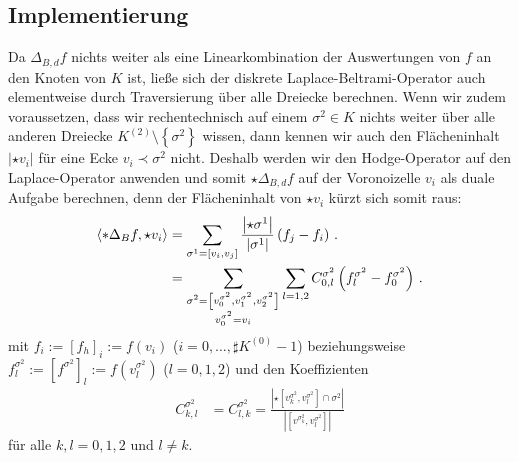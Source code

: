   \subsection{Implementierung}
    Da \( \Delta_{B,d} f \) nichts weiter als eine Linearkombination der Auswertungen von \( f \) an den
    Knoten von \( K \) ist, ließe sich der diskrete Laplace-Beltrami-Operator auch elementweise durch
    Traversierung über alle Dreiecke berechnen.
    Wenn wir zudem voraussetzen, dass wir rechentechnisch auf einem \( \sigma^{2}\in K \) nichts weiter
    über alle anderen Dreiecke \( K^{(2)}\setminus\left\{ \sigma^{2} \right\} \) wissen, 
    dann kennen wir auch den Flächeninhalt \( \left| \star v_{i} \right| \) für eine Ecke 
    \( v_{i}\prec\sigma^{2} \) nicht.
    Deshalb werden wir den Hodge-Operator auf den Laplace-Operator anwenden und somit \( \star\Delta_{B,d} f \)
    auf der Voronoizelle \( v_{i} \) als duale Aufgabe berechnen, 
    denn der Flächeninhalt von \( \star v_{i} \) kürzt sich
    somit raus:
    \begin{align}
      \left\langle *\Delta_{B} f , \star v_{i} \right\rangle
          &= \sum_{\sigma^{1}=\left[ v_{i}, v_{j} \right]} 
                       \frac{\left| \star\sigma^{1} \right|}{\left| \sigma^{1} \right|}
                       \left( f_{j} - f_{i} \right) \,\text{.} \\
          &= \sum_{\substack{\sigma^{2}=\left[ v^{\sigma^{2}}_{0},v^{\sigma^{2}}_{1},v^{\sigma^{2}}_{2} \right]\\
                                               v^{\sigma^{2}}_{0} = v_{i}}}
                  \sum_{l=1,2} C^{\sigma^{2}}_{0,l} 
                          \left( f^{\sigma^{2}}_{l} -  f^{\sigma^{2}}_{0}\right) \,\text{.}
          \label{eqLaplaceElementSummanden}
    \end{align}
    mit \( f_{i} := \left[ f_{h} \right]_{i} := f(v_{i}) \) (\( i=0,\ldots,\sharp K^{(0)}-1 \)) 
    beziehungsweise 
    \( f^{\sigma^{2}}_{l} := \left[ f^{\sigma^{2}} \right]_{l}:=f(v^{\sigma^{2}}_{l})\) 
    (\( l=0,1,2 \))
    und den Koeffizienten
    \begin{align}
      C^{\sigma^{2}}_{k,l} &= C^{\sigma^{2}}_{l,k}
                            = \frac{\left| \star \left[ v^{\sigma^{2}}_{k}, v^{\sigma^{2}}_{l} \right] 
                                            \cap \sigma^{2}\right|}
                                   {\left| \left[ v^{\sigma^{2}_{k}}, v^{\sigma^{2}}_{l} \right] \right|}
    \end{align}
    für alle \( k,l = 0,1,2 \) und \( l\neq k \).
